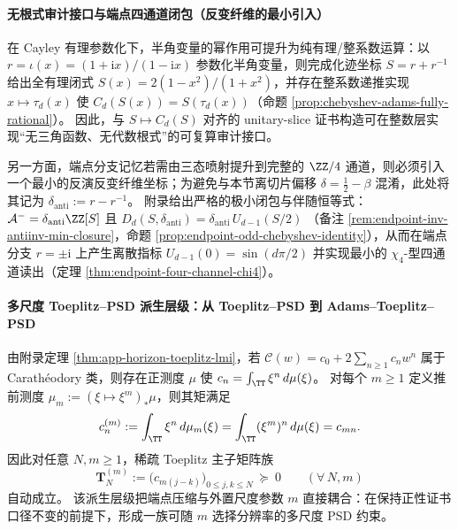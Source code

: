\paragraph{无根式审计接口与端点四通道闭包（反变纤维的最小引入）}
在 Cayley 有理参数化下，半角变量的幂作用可提升为纯有理/整系数运算：以
\(
r=\iota(x)=(1+\mathrm{i}x)/(1-\mathrm{i}x)
\)
参数化半角变量，则完成化迹坐标 \(S=r+r^{-1}\) 给出全有理闭式 \(S(x)=2(1-x^{2})/(1+x^{2})\)，并存在整系数递推实现 \(x\mapsto\tau_d(x)\) 使 \(C_d(S(x))=S(\tau_d(x))\)（命题 \ref{prop:chebyshev-adams-fully-rational}）。
因此，与 \(S\mapsto C_d(S)\) 对齐的 unitary-slice 证书构造可在整数层实现“无三角函数、无代数根式”的可复算审计接口。
\par
另一方面，端点分支记忆若需由三态喷射提升到完整的 \(\ZZ/4\) 通道，则必须引入一个最小的反演反变纤维坐标；为避免与本节离切片偏移 \(\delta=\tfrac12-\beta\) 混淆，此处将其记为
\(
\delta_{\mathrm{anti}}:=r-r^{-1}
\)。
附录给出严格的极小闭包与伴随恒等式：
\(
\mathcal A^{-}=\delta_{\mathrm{anti}}\ZZ[S]
\)
且
\(
D_d(S,\delta_{\mathrm{anti}})=\delta_{\mathrm{anti}}\,U_{d-1}(S/2)
\)
（备注 \ref{rem:endpoint-inv-antiinv-min-closure}，命题 \ref{prop:endpoint-odd-chebyshev-identity}），从而在端点分支 \(r=\pm\mathrm{i}\) 上产生离散指标 \(U_{d-1}(0)=\sin(d\pi/2)\) 并实现最小的 \(\chi_4\)-型四通道读出（定理 \ref{thm:endpoint-four-channel-chi4}）。

\paragraph{多尺度 Toeplitz--PSD 派生层级：从 Toeplitz--PSD 到 Adams--Toeplitz--PSD}
由附录定理 \ref{thm:app-horizon-toeplitz-lmi}，若 \(\mathscr{C}(w)=c_0+2\sum_{n\ge 1}c_n w^n\) 属于 Carath\'eodory 类，则存在正测度 \(\mu\) 使
\(
c_n=\int_{\TT}\xi^n\,d\mu(\xi)
\)。
对每个 \(m\ge 1\) 定义推前测度 \(\mu_m:=(\xi\mapsto \xi^m)_*\mu\)，则其矩满足
\[
c^{(m)}_n:=\int_{\TT}\xi^n\,d\mu_m(\xi)=\int_{\TT}(\xi^m)^n\,d\mu(\xi)=c_{mn}.
\]
因此对任意 \(N,m\ge 1\)，稀疏 Toeplitz 主子矩阵族
\begin{equation}\label{eq:xi-adams-toeplitz-psd}
\boxed{\;
\mathbf{T}^{(m)}_N
:=\bigl(c_{m(j-k)}\bigr)_{0\le j,k\le N}\ \succeq\ 0\qquad(\forall\,N,m)\;}
\end{equation}
自动成立。
该派生层级把端点压缩与外置尺度参数 \(m\) 直接耦合：在保持正性证书口径不变的前提下，形成一族可随 \(m\) 选择分辨率的多尺度 PSD 约束。

